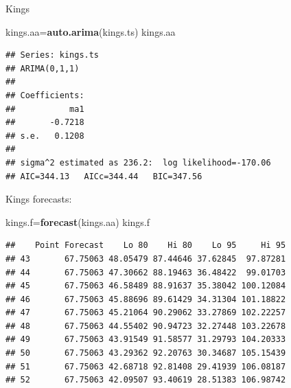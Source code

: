 \documentclass[
  ignorenonframetext,
]{beamer}
\newenvironment{Shaded}{\begin{snugshade}}{\end{snugshade}}
\newcommand{\KeywordTok}[1]{\textcolor[rgb]{0.13,0.29,0.53}{\textbf{#1}}}
\newcommand{\NormalTok}[1]{#1}
\begin{document}
\begin{frame}[fragile]{Kings}
\protect\hypertarget{kings}{}

\begin{Shaded}
\begin{Highlighting}[]
\NormalTok{kings.aa=}\KeywordTok{auto.arima}\NormalTok{(kings.ts)}
\NormalTok{kings.aa}
\end{Highlighting}
\end{Shaded}

\begin{verbatim}
## Series: kings.ts 
## ARIMA(0,1,1) 
## 
## Coefficients:
##           ma1
##       -0.7218
## s.e.   0.1208
## 
## sigma^2 estimated as 236.2:  log likelihood=-170.06
## AIC=344.13   AICc=344.44   BIC=347.56
\end{verbatim}

\end{frame}

\begin{frame}[fragile]{Kings forecasts:}
\protect\hypertarget{kings-forecasts}{}

\small

\begin{Shaded}
\begin{Highlighting}[]
\NormalTok{kings.f=}\KeywordTok{forecast}\NormalTok{(kings.aa)}
\NormalTok{kings.f}
\end{Highlighting}
\end{Shaded}

\begin{verbatim}
##    Point Forecast    Lo 80    Hi 80    Lo 95     Hi 95
## 43       67.75063 48.05479 87.44646 37.62845  97.87281
## 44       67.75063 47.30662 88.19463 36.48422  99.01703
## 45       67.75063 46.58489 88.91637 35.38042 100.12084
## 46       67.75063 45.88696 89.61429 34.31304 101.18822
## 47       67.75063 45.21064 90.29062 33.27869 102.22257
## 48       67.75063 44.55402 90.94723 32.27448 103.22678
## 49       67.75063 43.91549 91.58577 31.29793 104.20333
## 50       67.75063 43.29362 92.20763 30.34687 105.15439
## 51       67.75063 42.68718 92.81408 29.41939 106.08187
## 52       67.75063 42.09507 93.40619 28.51383 106.98742
\end{verbatim}

\normalsize

\end{frame}
\end{document}
